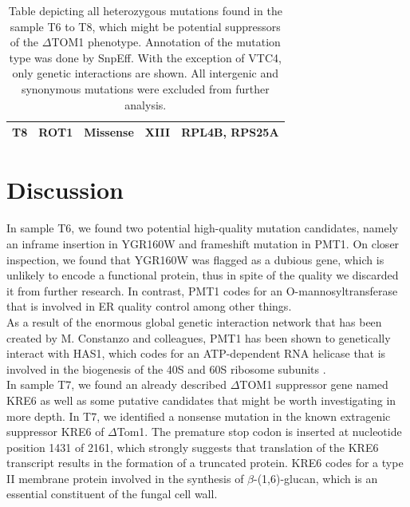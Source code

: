 \documentclass[10pt,a4paper]{article}
\begin{document}
\begin{table}[]
{\begin{tabular}{|l|l|l|l|l|}
			\textbf{T8} & ROT1 & Missense & XIII & RPL4B, RPS25A \\ \hline
		\end{tabular}%
	}
\caption{\small Table depicting all heterozygous mutations found in the sample T6 to T8, which might be potential suppressors of the $\Delta$TOM1 phenotype.  Annotation of the mutation type was done by SnpEff. With the exception of VTC4, only genetic interactions are shown. All intergenic and synonymous mutations were excluded from further analysis.}
\label{tab:mutationT68}	
\end{table}

\section*{Discussion}

In sample T6, we found two potential high-quality mutation candidates, namely an inframe insertion in YGR160W and frameshift mutation in PMT1. On closer inspection, we found that YGR160W was flagged as a dubious gene, which is unlikely to encode a functional protein, thus in spite of the quality we discarded it from further research. In contrast, PMT1 codes for an O-mannosyltransferase that is involved in ER quality control among other things\cite{strahl_pmti_1993}\cite{goder_protein_2011}.\\

\noindent As a result of the enormous global genetic interaction network that has been created by M. Constanzo and colleagues, PMT1 has been shown to genetically interact with HAS1, which codes for an ATP-dependent RNA helicase that is involved in the biogenesis of the 40S and 60S ribosome subunits\cite{costanzo_global_2016} \cite{dembowski_has1_2013}.\\ 

\noindent In sample T7, we found an already described $\Delta$TOM1 suppressor gene named KRE6 as well as some putative candidates that might be worth investigating in more depth. In T7, we identified a nonsense mutation in the known extragenic suppressor KRE6 of $\Delta$Tom1. The premature stop codon is inserted at nucleotide position 1431 of 2161, which strongly suggests that translation of the KRE6 transcript results in the formation of a truncated protein. KRE6 codes for a type II membrane protein involved in the synthesis of $\beta$-(1,6)-glucan, which is an essential constituent of the fungal cell wall\cite{kurita_kre6_2011, roemer_skn1_1993}.\\
\end{document}
